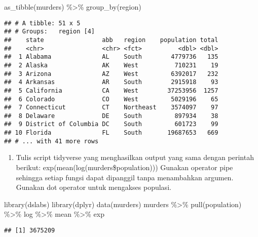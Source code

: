 \documentclass[
]{article}
\newenvironment{Shaded}{\begin{snugshade}}{\end{snugshade}}
\newcommand{\FunctionTok}[1]{\textcolor[rgb]{0.00,0.00,0.00}{#1}}
\newcommand{\NormalTok}[1]{#1}
\newcommand{\SpecialCharTok}[1]{\textcolor[rgb]{0.00,0.00,0.00}{#1}}
\providecommand{\tightlist}{%
  \setlength{\itemsep}{0pt}\setlength{\parskip}{0pt}}
\begin{document}
\begin{Shaded}
\begin{Highlighting}[]
\FunctionTok{as\_tibble}\NormalTok{(murders) }\SpecialCharTok{\%\textgreater{}\%} \FunctionTok{group\_by}\NormalTok{(region)}
\end{Highlighting}
\end{Shaded}

\begin{verbatim}
## # A tibble: 51 x 5
## # Groups:   region [4]
##    state                abb   region    population total
##    <chr>                <chr> <fct>          <dbl> <dbl>
##  1 Alabama              AL    South        4779736   135
##  2 Alaska               AK    West          710231    19
##  3 Arizona              AZ    West         6392017   232
##  4 Arkansas             AR    South        2915918    93
##  5 California           CA    West        37253956  1257
##  6 Colorado             CO    West         5029196    65
##  7 Connecticut          CT    Northeast    3574097    97
##  8 Delaware             DE    South         897934    38
##  9 District of Columbia DC    South         601723    99
## 10 Florida              FL    South       19687653   669
## # ... with 41 more rows
\end{verbatim}

\begin{enumerate}
\def\labelenumi{\arabic{enumi}.}
\setcounter{enumi}{2}
\tightlist
\item
  Tulis script tidyverse yang menghasilkan output yang sama dengan
  perintah berikut: exp(mean(log(murders\$population))) Gunakan operator
  pipe sehingga setiap fungsi dapat dipanggil tanpa menambahkan argumen.
  Gunakan dot operator untuk mengakses populasi.
\end{enumerate}

\begin{Shaded}
\begin{Highlighting}[]
\FunctionTok{library}\NormalTok{(dslabs)}
\FunctionTok{library}\NormalTok{(dplyr)}
\FunctionTok{data}\NormalTok{(murders)}
\NormalTok{murders }\SpecialCharTok{\%\textgreater{}\%} 
     \FunctionTok{pull}\NormalTok{(population) }\SpecialCharTok{\%\textgreater{}\%} 
\NormalTok{     log }\SpecialCharTok{\%\textgreater{}\%}
\NormalTok{     mean }\SpecialCharTok{\%\textgreater{}\%} 
\NormalTok{     exp}
\end{Highlighting}
\end{Shaded}

\begin{verbatim}
## [1] 3675209
\end{verbatim}
\end{document}
